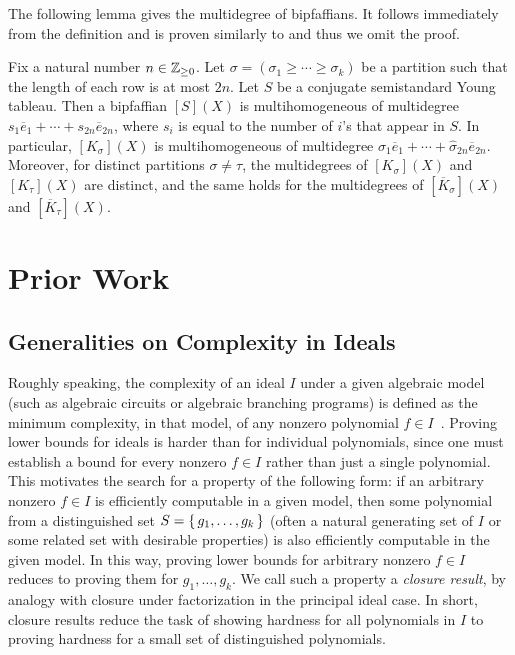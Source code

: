 \documentclass[letterpaper, 11pt]{amsart}
\begin{document}
The following lemma gives the multidegree of bipfaffians.
It follows immediately from the definition and is proven similarly to  and thus we omit the proof.
\begin{lem}\label{lem:canonical_degs_bifpaffian}
    Fix a natural number $n \in \mathbb{Z}_{\geq 0}$.
    Let $\sigma = (\sigma_1 \geq \cdots \geq \sigma_k)$ be a partition such that the length of each row is at most $2n$.
    Let $S$ be a conjugate semistandard Young tableau.
    Then a bipfaffian $[S](X)$ is multihomogeneous of multidegree $s_1 \overline{e}_1 + \cdots + s_{2n} \overline{e}_{2n}$, where $s_i$ is equal to the number of $i$'s that appear in $S$.
    In particular, $[K_\sigma](X)$ is multihomogeneous of multidegree $\widehat{\sigma}_1 \overline{e}_1 + \cdots + \widehat{\sigma}_{2n} \overline{e}_{2n}$.
    Moreover, for distinct partitions $\sigma \neq \tau$, the multidegrees of $[K_\sigma](X)$ and $[K_\tau](X)$ are distinct, and the same holds for the multidegrees of $[\overline{K}_\sigma](X)$ and $[\overline{K}_\tau](X)$.
\end{lem}
\fi

\section{Prior Work}

\subsection{Generalities on Complexity in Ideals}

Roughly speaking, the complexity of an ideal $I$ under a given algebraic model (such as algebraic circuits or algebraic branching programs) is defined as the minimum complexity, in that model, of any nonzero polynomial $f \in I$~\cite{Gro20}.
Proving lower bounds for ideals is harder than for individual polynomials, since one must establish a bound for every nonzero $f \in I$ rather than just a single polynomial.
This motivates the search for a property of the following form: if an arbitrary nonzero $f \in I$ is efficiently computable in a given model, then some polynomial from a distinguished set $S = \set{g_1, \dots, g_k}$ (often a natural generating set of $I$ or some related set with desirable properties) is also efficiently computable in the given model.
In this way, proving lower bounds for arbitrary nonzero $f \in I$ reduces to proving them for $g_1, \dots, g_k$.
We call such a property a \emph{closure result}, by analogy with closure under factorization in the principal ideal case.
In short, closure results reduce the task of showing hardness for all polynomials in $I$ to proving hardness for a small set of distinguished polynomials.
\end{document}
